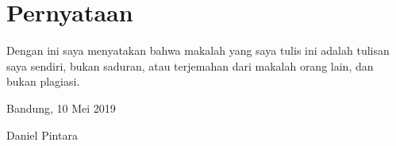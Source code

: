 \documentclass[conference]{IEEEtran}
\begin{document}








\section*{Pernyataan}

Dengan ini saya menyatakan bahwa makalah yang saya tulis ini adalah tulisan saya sendiri, bukan saduran, atau terjemahan dari makalah orang lain, dan bukan plagiasi.

\vspace{12pt}
\begin{flushright}
    Bandung, 10 Mei 2019

    \vspace{40pt}
    Daniel Pintara
\end{flushright}
\end{document}
